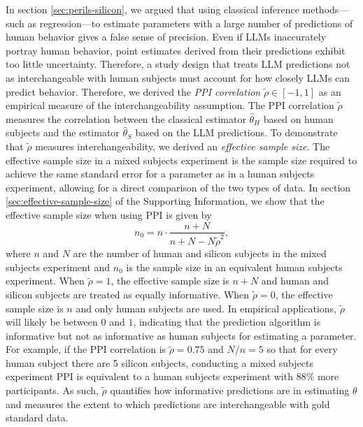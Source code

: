 \documentclass{article}
\begin{document}
In section \ref{sec:perils-silicon}, we argued that using classical inference methods---such as regression---to estimate parameters with a large number of predictions of human behavior gives a false sense of precision. Even if LLMs inaccurately portray human behavior, point estimates derived from their predictions exhibit too little uncertainty.
Therefore, a study design that treats LLM predictions not as interchangeable with human subjects must account for how closely LLMs can predict behavior. Therefore, we derived the \emph{PPI correlation} $\tilde{\rho} \in [-1,1]$ as an empirical measure of the interchangeability assumption. The PPI correlation $\widetilde{\rho}$ measures the correlation between the classical estimator $\hat{\theta}_{H}$ based on human subjects and the estimator $\hat{\theta}_S$ based on the LLM predictions. To demonstrate that $\tilde{\rho}$ measures interchangeability, we derived an \textit{effective sample size}. The effective sample size in a mixed subjects experiment is the sample size required to achieve the same standard error for a parameter as in a human subjects experiment, allowing for a direct comparison of the two types of data. In section \ref{sec:effective-sample-size} of the Supporting Information, we show that the effective sample size when using PPI is given by
\begin{equation}\label{eq:n0}
    n_0 = n\cdot\frac{n+N}{n+N-N\tilde{\rho}^2},
\end{equation}
where $n$ and $N$ are the number of human and silicon subjects in the mixed subjects experiment and $n_0$ is the sample size in an equivalent human subjects experiment. 
When $\tilde{\rho}=1$, the effective sample size is $n+N$ and human and silicon subjects are treated as equally informative. When $\tilde{\rho}=0$, the effective sample size is $n$ and only human subjects are used. In empirical applications, $\tilde{\rho}$ will likely be between $0$ and $1$, indicating that the prediction algorithm is informative but not as informative as human subjects for estimating a parameter.
For example, if the PPI correlation is $\tilde{\rho}=0.75$ and $N/n=5$ so that for every human subject there are 5 silicon subjects, conducting a mixed subjects experiment PPI is equivalent to a human subjects experiment with 88\% more participants. As such, $\tilde{\rho}$ quantifies how informative predictions are in estimating $\theta$ and measures the extent to which predictions are interchangeable with gold standard data. 
\end{document}
